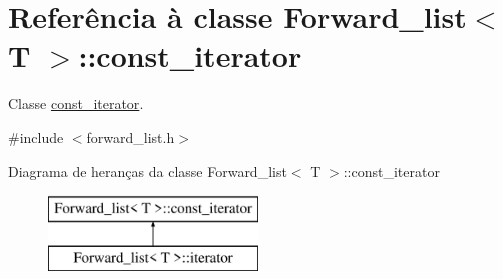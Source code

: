 \hypertarget{class_forward__list_1_1const__iterator}{}\section{Referência à classe Forward\+\_\+list$<$ T $>$\+:\+:const\+\_\+iterator}
\label{class_forward__list_1_1const__iterator}


Classe \hyperlink{class_forward__list_1_1const__iterator}{const\+\_\+iterator}.  




{\ttfamily \#include $<$forward\+\_\+list.\+h$>$}

Diagrama de heranças da classe Forward\+\_\+list$<$ T $>$\+:\+:const\+\_\+iterator\begin{figure}[H]
\begin{center}
\leavevmode
\includegraphics[height=2.000000cm]{class_forward__list_1_1const__iterator}
\end{center}
\end{figure}
